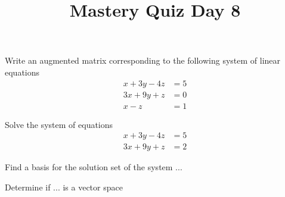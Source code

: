 \documentclass{sbgLAquiz}
\title{Mastery Quiz Day 8 }
\begin{document}
\begin{problem}[E1]
Write an augmented matrix corresponding to the following system of linear equations
\begin{align*}
x+3y-4z &= 5 \\
3x+9y+z &= 0 \\
x-z &= 1
\end{align*}
\end{problem}

\begin{problem}[E3]
Solve the system of equations
\begin{align*}
x+3y-4z &= 5 \\
3x+9y+z &= 2
\end{align*}
\end{problem}

\begin{problem}[E4]
Find a basis for the solution set of the system ...
\end{problem}

\begin{problem}[V1]
Determine if ... is a vector space
\end{problem}
\end{document}
